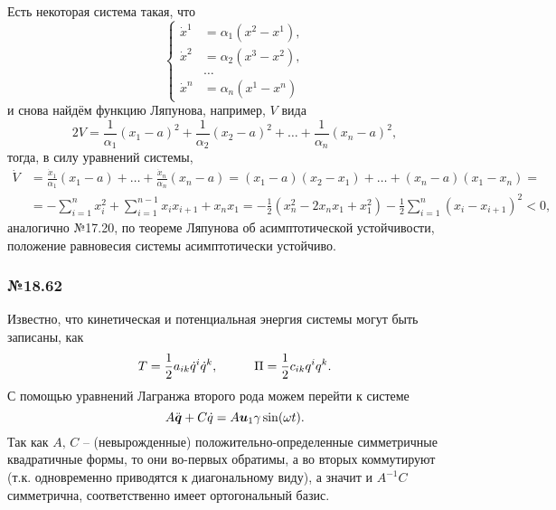 Есть некоторая система такая, что
\begin{equation*}
    \left\{\begin{aligned}
        \dot{x}^1 &= \alpha_1 (x^2 - x^1), \\
        \dot{x}^2 &= \alpha_2 (x^3 - x^2), \\
        &\ldots\\
        \dot{x}^n &= \alpha_n (x^1 - x^n)
    \end{aligned}\right.
\end{equation*}
и снова найдём функцию Ляпунова, например, $V$ вида
\begin{equation*}
    2 V = \frac{1}{\alpha_1}(x_1 - a)^2 + \frac{1}{\alpha_2} (x_2 - a)^2 + \ldots + \frac{1}{\alpha_n}(x_n - a)^2,
\end{equation*}
тогда, в силу уравнений системы,
\begin{align*}
    \dot{V} &= \frac{\dot{x}_1}{\alpha_1} (x_1 - a) + \ldots + 
    \frac{\dot{x}_n}{\alpha_n}(x_n - a) = 
    (x_1 - a) (x_2 - x_1) + \ldots + (x_n - a) (x_1 - x_n) = \\
    &= - \sum_{i=1}^{n} x_i^2 + 
    \sum_{i=1}^{n-1} x_i x_{i+1} + x_n x_1 = 
    - \frac{1}{2}(x_n^2 - 2 x_n x_1 + x_1^2) - \frac{1}{2} 
    \sum_{i=1}^{n} (x_i - x_{i+1})^2 < 0,
\end{align*}
аналогично №17.20,
по теореме Ляпунова об асимптотической устойчивости,
положение равновесия системы асимптотически устойчиво.













\subsubsection*{№18.62}
Известно, что кинетическая и потенциальная энергия системы могут быть записаны, как
\begin{equation*}
    T = \frac{1}{2} a_{ik} \dot{q}^i \dot{q}^k,
    \hspace{1 cm}
    \Pi = \frac{1}{2} c_{ik} q^i q^k.
\end{equation*}
С помощью уравнений Лагранжа второго рода можем перейти  к системе
\begin{equation*}
    A \ddot{\mbox{\boldmath $q$}} + C \dot{q} = A \mbox{\boldmath $u$}_1 \gamma \sin (\omega t).
\end{equation*}
Так как $A, \,C$ -- (невырожденные) положительно-определенные симметричные квадратичные формы, то они во-первых обратимы, а во вторых коммутируют (т.к. одновременно приводятся к диагональному виду), а значит и $A^{-1} C$ симметрична, соответственно имеет ортогональный базис.

